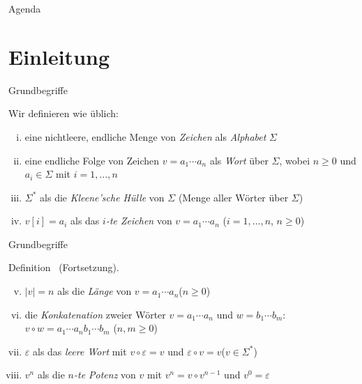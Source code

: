\documentclass[xcolor=dvipsnames, aspectratio=1610]{beamer}
\begin{document}
\frame[t,plain,label=titel]{
	\titlepage
}

\begin{frame}{Agenda}
       \tableofcontents[ 
  		currentsubsection, 
  		hideothersubsections, 
   	 	sectionstyle=show, 
   	 ] 
\end{frame}

\section{Einleitung}

\printSectionYes

\begin{frame}[<+->]{Grundbegriffe}
\begin{defi}
Wir definieren wie üblich:
\begin{enumerate}[(i)]
\item eine nichtleere, endliche Menge von \textit{Zeichen} als \textit{Alphabet} $\Sigma$
\item eine endliche Folge von Zeichen $v=a_1\cdots a_n$ als \textit{Wort} über $\Sigma$, wobei $n\geq 0$ und $a_i\in\Sigma$ mit $i=1,\dots,n$
\item $\Sigma^*$ als die \textit{Kleene'sche Hülle} von $\Sigma$ (Menge aller Wörter über $\Sigma$)
\item $v[i]=a_i$ als das \textit{$i$-te Zeichen} von $v=a_1\cdots a_n$ \hfill($i=1,\dots,n$, $n\geq 0$)
\end{enumerate}
\end{defi}
\end{frame}

\begin{frame}[<+->]{Grundbegriffe}
\begin{mybox}{Definition \thedefinition\ (Fortsetzung).}
\begin{enumerate}[(i)]\setcounter{enumi}{4}
\item $\vert v\vert=n$ als die \textit{Länge} von $v=a_1\cdots a_n$\hfill($n\geq 0$)
\item die \textit{Konkatenation} zweier Wörter $v=a_1\cdots a_n$ und $w=b_1\cdots b_m$: $v\circ w=a_1\cdots a_nb_1\cdots b_m$ \hfill($n,m\geq 0$)
\item $\varepsilon$ als das \textit{leere Wort} mit $v\circ\varepsilon = v$ und $\varepsilon\circ v=v$\hfill($v\in\Sigma^*$)
\item $v^n$ als die \textit{$n$-te Potenz} von $v$ mit $v^n=v\circ v^{n-1}$ und $v^0 =\varepsilon$
\end{enumerate}
\end{mybox}
\end{frame}
\end{document}
